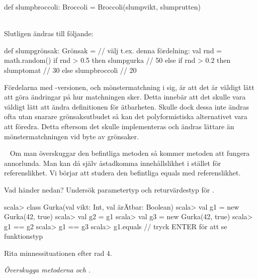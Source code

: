 \begin{Code}
def slumpbroccoli: Broccoli = Broccoli(slumpvikt, slumprutten)
\end{Code}
~\\
Slutligen ändras  till följande:

\begin{Code}
def slumpgrönsak: Grönsak =     // välj t.ex. denna fördelning:
  val rnd = math.random()
  if rnd > 0.5 then slumpgurka      // 50%
  else if rnd > 0.2 then slumptomat // 30%
  else slumpbroccoli             // 20%

\end{Code}

\SubtaskSolved  Fördelarna med -versionen, och mönstermatchning i sig, är att det är väldigt lätt att göra ändringar på hur matchningen sker. Detta innebär att det skulle vara väldigt lätt att ändra definitionen för ätbarheten. Skulle dock dessa inte ändras ofta utan snarare grönsaksutbudet så kan det polyformistiska alternativet vara att föredra. Detta eftersom det skulle implementeras och ändras lättare än mönstermatchningen vid byte av grönsaker.



\QUESTEND






\QUESTBEGIN

\Task  \what~   Om man överskuggar den befintliga metoden  så kommer metoden \code{==} att fungera annorlunda. Man kan då själv åstadkomma innehållslikhet i stället för referenslikhet. Vi börjar att studera den befintliga equals med referenslikhet.

\Subtask \label{subtask:refequals} Vad händer nedan? Undersök parametertyp och returvärdestyp för  .
\begin{REPL}
scala> class Gurka(val vikt: Int, val ärÄtbar: Boolean)
scala> val g1 = new Gurka(42, true)
scala> val g2 = g1
scala> val g3 = new Gurka(42, true)
scala> g1 == g2
scala> g1 == g3
scala> g1.equals  // tryck ENTER för att se funktionstyp
\end{REPL}

\Subtask Rita minnessituationen efter rad 4.

\Subtask \emph{Överskugga metoderna  och .}

